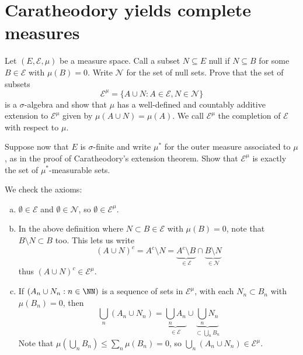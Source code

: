 \documentclass[11pt, headheight=30pt]{scrartcl}
\begin{document}
\pagebreak
\section{Caratheodory yields complete measures}
\begin{prob*}
    Let $(E, \mathcal{E}, \mu)$ be a measure space. Call a subset $N \subseteq E$ null if
    $N \subseteq B$ for some $B \in \mathcal{E}$ with $\mu(B) = 0$.
    Write $\mathcal{N}$ for the set of null sets.
    Prove that the set of subsets
    \[
        \mathcal{E}^\mu = \{A \cup N : A \in \mathcal{E}, N \in \mathcal{N}\}
    \]
    is a $\sigma$-algebra and show that $\mu$ has a well-defined and countably
    additive extension to $\mathcal{E}^\mu$ given by $\mu(A \cup N) = \mu(A)$.
    We call $\mathcal{E}^\mu$ the completion of $\mathcal{E}$ with respect to
    $\mu$.
    
    Suppose now that $E$ is $\sigma$-finite and write $\mu^*$
    for the outer measure associated to $\mu$, as in the proof of Caratheodory's
    extension theorem. Show that $\mathcal{E}^\mu$ is exactly the
    set of $\mu^*$-measurable sets.
\end{prob*}

\begin{psec*}
    We check the axioms:
    \begin{enumerate}[(a)]
        \item $\emptyset \in \mathcal{E}$ and $\emptyset \in \mathcal{N}$,
        so $\emptyset \in \mathcal{E}^\mu$.
        \item In the above definition where $N\subset B \in \mathcal{E}$ with $\mu(B) = 0$,
        note that $B\setminus N \subset B$ too. This lets us write
        \[
            \left(A\cup N\right)^c = A^c \setminus N
            = \underbrace{A^c\setminus B}_{\in \mathcal{E}} \cap \underbrace{B\setminus N}_{\in \mathcal{N}}
        \]
        thus $\left(A\cup N\right)^c \in \mathcal{E}^\mu$.

        \item If $(A_n\cup N_n : n\in \NN)$ is a sequence of sets in $\mathcal{E}^\mu$,
        with each $N_n\subset B_n$ with $\mu(B_n) = 0$,
        then
        \[
            \bigcup_n \left(A_n\cup N_n\right) = \underbrace{\bigcup_n A_n}_{\in \mathcal{E}} \cup \underbrace{\bigcup_n N_n}_{\subset \bigcup_n B_n}
        \]
        Note that $\mu\left(\bigcup_n B_n\right)\leq \sum_n \mu(B_n) = 0$,
        so $\bigcup_n \left(A_n\cup N_n\right) \in \mathcal{E}^\mu$.
    \end{enumerate}
\end{psec*}
\end{document}
